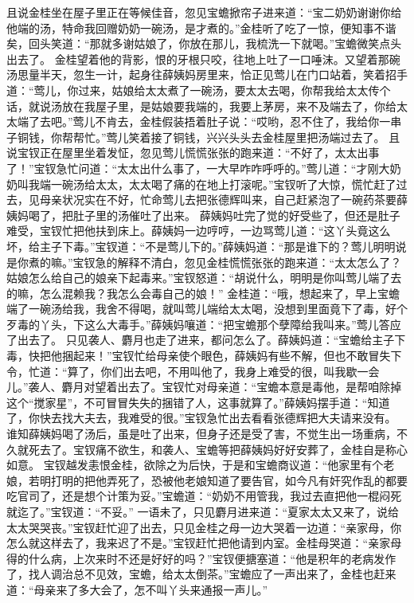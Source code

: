 \documentclass[12pt,oneside]{book}
\begin{document}
且说金桂坐在屋子里正在等候佳音，忽见宝蟾掀帘子进来道：“宝二奶奶谢谢你给他端的汤，特命我回赠奶奶一碗汤，是才煮的。”金桂听了吃了一惊，便知事不谐矣，回头笑道：“那就多谢姑娘了，你放在那儿，我梳洗一下就喝。”宝蟾微笑点头出去了。
金桂望着他的背影，恨的牙根只咬，往地上吐了一口唾沫。又望着那碗汤思量半天，忽生一计，起身往薛姨妈房里来，恰正见莺儿在门口站着，笑着招手道：“莺儿，你过来，姑娘给太太煮了一碗汤，要太太去喝，你帮我给太太传个话，就说汤放在我屋子里，是姑娘要我端的，我要上茅房，来不及端去了，你给太太端了去吧。”莺儿不肯去，金桂假装捂着肚子说：“哎哟，忍不住了，我给你一串子铜钱，你帮帮忙。”莺儿笑着接了铜钱，兴兴头头去金桂屋里把汤端过去了。
且说宝钗正在屋里坐着发怔，忽见莺儿慌慌张张的跑来道：“不好了，太太出事了！”宝钗急忙问道：“太太出什么事了，一大早咋咋呼呼的。”莺儿道：“才刚大奶奶叫我端一碗汤给太太，太太喝了痛的在地上打滚呢。”宝钗听了大惊，慌忙赶了过去，见母亲状况实在不好，忙命莺儿去把张德辉叫来，自己赶紧泡了一碗药茶要薛姨妈喝了，把肚子里的汤催吐了出来。
薛姨妈吐完了觉的好受些了，但还是肚子难受，宝钗忙把他扶到床上。薛姨妈一边哼哼，一边骂莺儿道：“这丫头竟这么坏，给主子下毒。”宝钗道：“不是莺儿下的。”薛姨妈道：“那是谁下的？莺儿明明说是你煮的嘛。”宝钗急的解释不清白，忽见金桂慌慌张张的跑来道：“太太怎么了？姑娘怎么给自己的娘亲下起毒来。”宝钗怒道：“胡说什么，明明是你叫莺儿端了去的嘛，怎么混赖我？我怎么会毒自己的娘！”
金桂道：“哦，想起来了，早上宝蟾端了一碗汤给我，我舍不得喝，就叫莺儿端给太太喝，没想到里面竟下了毒，好个歹毒的丫头，下这么大毒手。”薛姨妈嚷道：“把宝蟾那个孽障给我叫来。”莺儿答应了出去了。
只见袭人、麝月也走了进来，都问怎么了。薛姨妈道：“宝蟾给主子下毒，快把他捆起来！”宝钗忙给母亲使个眼色，薛姨妈有些不解，但也不敢冒失下令，忙道：“算了，你们出去吧，不用叫他了，我身上难受的很，叫我歇一会儿。”袭人、麝月对望着出去了。宝钗忙对母亲道：“宝蟾本意是毒他，是帮咱除掉这个“搅家星”，不可冒冒失失的捆错了人，这事就算了。”薛姨妈摆手道：“知道了，你快去找大夫去，我难受的很。”宝钗急忙出去看看张德辉把大夫请来没有。
谁知薛姨妈喝了汤后，虽是吐了出来，但身子还是受了害，不觉生出一场重病，不久就死去了。宝钗痛不欲生，和袭人、宝蟾等把薛姨妈好好安葬了，金桂自是称心如意。
宝钗越发恚恨金桂，欲除之为后快，于是和宝蟾商议道：“他家里有个老娘，若明打明的把他弄死了，恐被他老娘知道了要告官，如今凡有奸究作乱的都要吃官司了，还是想个计策为妥。”宝蟾道：“奶奶不用管我，我过去直把他一棍闷死就迄了。”宝钗道：“不妥。”
一语未了，只见麝月进来道：“夏家太太又来了，说给太太哭哭丧。”宝钗赶忙迎了出去，只见金桂之母一边大哭着一边道：“亲家母，你怎么就这样去了，我来迟了不是。”宝钗赶忙把他请到内室。金桂母哭道：“亲家母得的什么病，上次来时不还是好好的吗？”宝钗便搪塞道：“他是积年的老病发作了，找人调治总不见效，宝蟾，给太太倒茶。”宝蟾应了一声出来了，金桂也赶来道：“母亲来了多大会了，怎不叫丫头来通报一声儿。”
\end{document}
